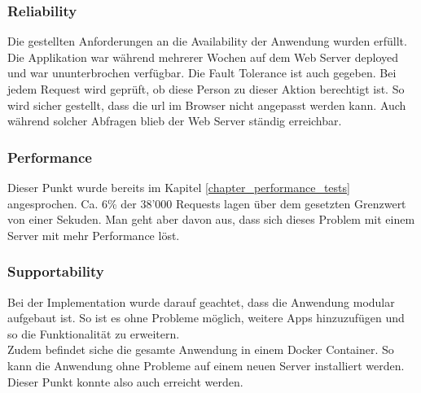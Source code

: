 \subsubsection*{Reliability}
Die gestellten Anforderungen an die Availability der Anwendung wurden erfüllt. Die Applikation war während mehrerer Wochen auf dem Web Server deployed und war ununterbrochen verfügbar. Die Fault Tolerance ist auch gegeben. Bei jedem Request wird geprüft, ob diese Person zu dieser Aktion berechtigt ist. So wird sicher gestellt, dass die \gls{url} im Browser nicht angepasst werden kann. Auch während solcher Abfragen blieb der Web Server ständig erreichbar.


\subsubsection*{Performance}
Dieser Punkt wurde bereits im Kapitel \ref{chapter_performance_tests} angesprochen. Ca. 6\% der 38'000 Requests lagen über dem gesetzten Grenzwert von einer Sekuden. Man geht aber davon aus, dass sich dieses Problem mit einem Server mit mehr Performance löst.

\subsubsection*{Supportability}
Bei der Implementation wurde darauf geachtet, dass die Anwendung modular aufgebaut ist. So ist es ohne Probleme möglich, weitere Apps hinzuzufügen und so die Funktionalität zu erweitern.\\

Zudem befindet siche die gesamte Anwendung in einem Docker Container. So kann die Anwendung ohne Probleme auf einem neuen Server installiert werden. Dieser Punkt konnte also auch erreicht werden.












\newpage
